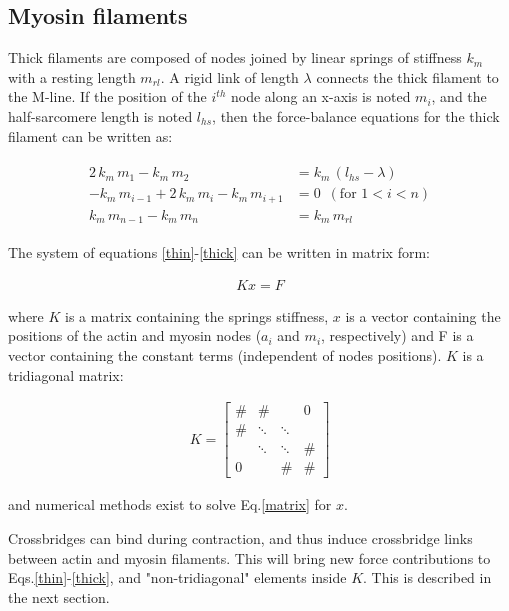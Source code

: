 \documentclass[a4paper,11pt]{article}
\begin{document}
\subsection{Myosin filaments}

Thick filaments are composed of nodes joined by linear springs of stiffness $k_{m}$ with a resting length $m_{rl}$. A rigid link of length $\lambda$ connects the thick filament to the M-line. If the position of the $i^{th}$ node along an x-axis is noted $m_i$, and the half-sarcomere length is noted $l_{hs}$, then the force-balance equations for the thick filament can be written as:


\begin{eqnarray}
\begin{aligned}
2 \, k_m \, m_1 - k_m \, m_2 &= k_m \, (l_{hs}- \lambda) \\
-  k_m \, m_{i-1} + 2 \, k_m \, m_i - k_m \, m_{i+1} &= 0 \,\,\, (\mathrm{for} \,\, 1 < i < n) \\
k_m \, m_{n-1} - k_m \, m_n &= k_m \, m_{rl}
\label{thick}
\end{aligned}
\end{eqnarray}

The system of equations \eqref{thin}-\eqref{thick} can be written in matrix form:

\begin{eqnarray}
K x = F
\label{matrix}
\end{eqnarray}

\noindent where $K$ is a matrix containing the springs stiffness, $x$ is a vector containing the positions of the actin and myosin nodes ($a_i$ and $m_i$, respectively) and F is a vector containing the constant terms (independent of nodes positions). $K$ is a tridiagonal matrix: 

\begin{eqnarray*}
K = \left [ \begin{matrix}
\# & \# & & 0 \\
\# & \ddots & \ddots &  \\
& \ddots & \ddots &  \# \\
0 &  & \# & \#  
\end{matrix}  
\right]
\end{eqnarray*} 

\noindent and numerical methods exist to solve Eq.\eqref{matrix} for $x$.

\null 

\noindent Crossbridges can bind during contraction, and thus induce crossbridge links between actin and myosin filaments. This will bring new force contributions to Eqs.\eqref{thin}-\eqref{thick}, and "non-tridiagonal" elements inside $K$. This is described in the next section.
\end{document}
